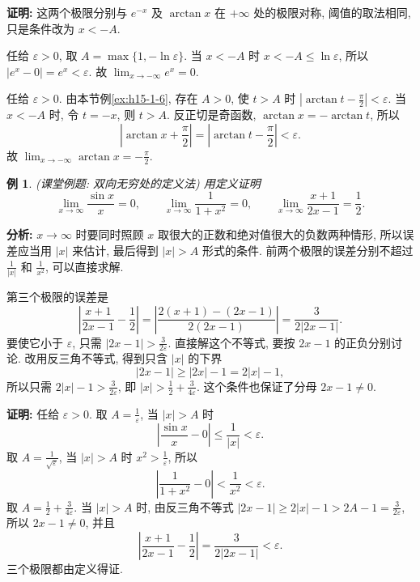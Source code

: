 \documentclass[UTF8,openany]{ctexbook}
\theoremstyle{chinesetextbook}
\newtheorem{example}{例}[section]
\newenvironment{cnproof}{\par\indent\textbf{证明:} \ignorespaces}{\par}
\begin{document}
\begin{cnproof}
这两个极限分别与 $e^{-x}$ 及 $\arctan x$ 在 $+\infty$ 处的极限对称, 阈值的取法相同, 只是条件改为 $x<-A$.

任给 $\varepsilon>0$, 取 $A=\max\{1,-\ln\varepsilon\}$. 当 $x<-A$ 时 $x<-A\le\ln\varepsilon$, 所以 $|e^x-0|=e^x<\varepsilon$. 故 $\displaystyle\lim_{x\to-\infty}e^x=0$.

任给 $\varepsilon>0$. 由本节例\ref{ex:h15-1-6}, 存在 $A>0$, 使 $t>A$ 时 $\displaystyle\left|\arctan t-\frac\pi2\right|<\varepsilon$. 当 $x<-A$ 时, 令 $t=-x$, 则 $t>A$. 反正切是奇函数, $\arctan x=-\arctan t$, 所以
\[
\left|\arctan x+\frac\pi2\right|=\left|\arctan t-\frac\pi2\right|<\varepsilon.
\]
故 $\displaystyle\lim_{x\to-\infty}\arctan x=-\frac\pi2$.
\end{cnproof}
\begin{example}
\textnormal{(课堂例题: 双向无穷处的定义法)} 用定义证明
\[
\lim_{x\to\infty}\frac{\sin x}x=0,\qquad\lim_{x\to\infty}\frac1{1+x^2}=0,\qquad\lim_{x\to\infty}\frac{x+1}{2x-1}=\frac12.
\]
\end{example}
\par\indent\textbf{分析:} $x\to\infty$ 时要同时照顾 $x$ 取很大的正数和绝对值很大的负数两种情形, 所以误差应当用 $|x|$ 来估计, 最后得到 $|x|>A$ 形式的条件. 前两个极限的误差分别不超过 $\displaystyle\frac1{|x|}$ 和 $\displaystyle\frac1{x^2}$, 可以直接求解.

第三个极限的误差是
\[
\left|\frac{x+1}{2x-1}-\frac12\right|=\left|\frac{2(x+1)-(2x-1)}{2(2x-1)}\right|=\frac3{2|2x-1|}.
\]
要使它小于 $\varepsilon$, 只需 $\displaystyle|2x-1|>\frac3{2\varepsilon}$. 直接解这个不等式, 要按 $2x-1$ 的正负分别讨论. 改用反三角不等式, 得到只含 $|x|$ 的下界
\[
|2x-1|\ge|2x|-1=2|x|-1,
\]
所以只需 $\displaystyle2|x|-1>\frac3{2\varepsilon}$, 即 $\displaystyle|x|>\frac12+\frac3{4\varepsilon}$. 这个条件也保证了分母 $2x-1\ne0$.
\begin{cnproof}
任给 $\varepsilon>0$. 取 $\displaystyle A=\frac1\varepsilon$, 当 $|x|>A$ 时
\[
\left|\frac{\sin x}x-0\right|\le\frac1{|x|}<\varepsilon.
\]
取 $\displaystyle A=\frac1{\sqrt\varepsilon}$, 当 $|x|>A$ 时 $\displaystyle x^2>\frac1\varepsilon$, 所以
\[
\left|\frac1{1+x^2}-0\right|<\frac1{x^2}<\varepsilon.
\]
取 $\displaystyle A=\frac12+\frac3{4\varepsilon}$. 当 $|x|>A$ 时, 由反三角不等式 $\displaystyle|2x-1|\ge2|x|-1>2A-1=\frac3{2\varepsilon}$, 所以 $2x-1\ne0$, 并且
\[
\left|\frac{x+1}{2x-1}-\frac12\right|=\frac3{2|2x-1|}<\varepsilon.
\]
三个极限都由定义得证.
\end{cnproof}
\end{document}
